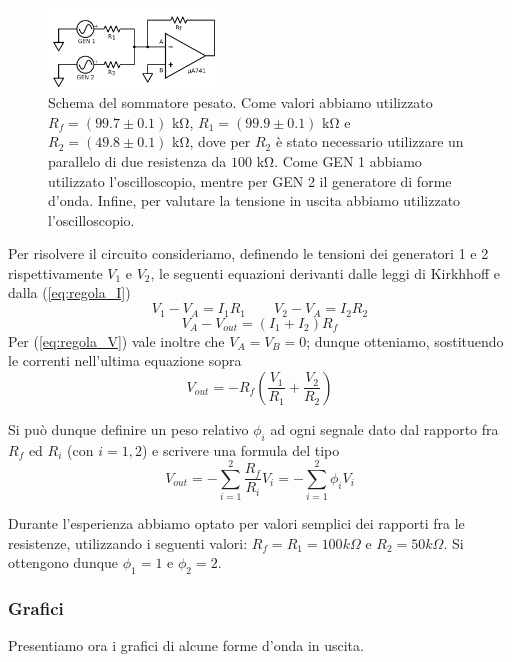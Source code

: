 \begin{figure}
  \begin{center}
    \includegraphics[width=0.40\textwidth]{../E01/latex/c2.pdf}
  \end{center}
  \caption{Schema del sommatore pesato. Come valori abbiamo utilizzato $R_f=(99.7 \pm 0.1)$ \si{\kilo\ohm}, $R_1=(99.9 \pm 0.1)$ \si{\kilo\ohm} e $R_2=(49.8 \pm 0.1)$ \si{\kilo\ohm}, dove per $R_2$ è stato necessario utilizzare un parallelo di due resistenza da $100$ \si{\kilo\ohm}. Come GEN 1 abbiamo utilizzato l'oscilloscopio, mentre per GEN 2 il generatore di forme d'onda. Infine, per valutare la tensione in uscita abbiamo utilizzato l'oscilloscopio.}
  \label{sommatore_pesato}
\end{figure}

Per risolvere il circuito consideriamo, definendo le tensioni dei generatori 1 e 2 rispettivamente $V_1$ e $V_2$, le seguenti equazioni derivanti dalle leggi di Kirkhhoff e dalla (\ref{eq:regola_I})
$$V_1 - V_A =I_1 R_1 \qquad V_2 - V_A =I_2 R_2$$
$$V_A - V_{out} =(I_1+I_2) R_f$$
Per (\ref{eq:regola_V}) vale inoltre che $V_A=V_B=0$; dunque otteniamo, sostituendo le correnti nell'ultima equazione sopra
$$V_{out}=-R_f \left( \frac{V_1}{R_1}+\frac{V_2}{R_2}\right)$$

Si può dunque definire un peso relativo $\phi_i$ ad ogni segnale dato dal rapporto fra $R_f$ ed $R_{i}$ (con $i=1,2$) e scrivere una formula del tipo
$$V_{out}=-\sum^{2}_{i=1} \frac{R_f}{R_{i}}V_{i}=-\sum^{2}_{i=1} \phi_i V_{i}$$

Durante l'esperienza abbiamo optato per valori semplici dei rapporti fra le resistenze, utilizzando i seguenti valori: $R_f=R_1=100 k\Omega$ e $R_2=50 k\Omega$. Si ottengono dunque $\phi_1=1$ e $\phi_2=2$.

\subsubsection{Grafici}

Presentiamo ora i grafici di alcune forme d'onda in uscita.

$$$$

